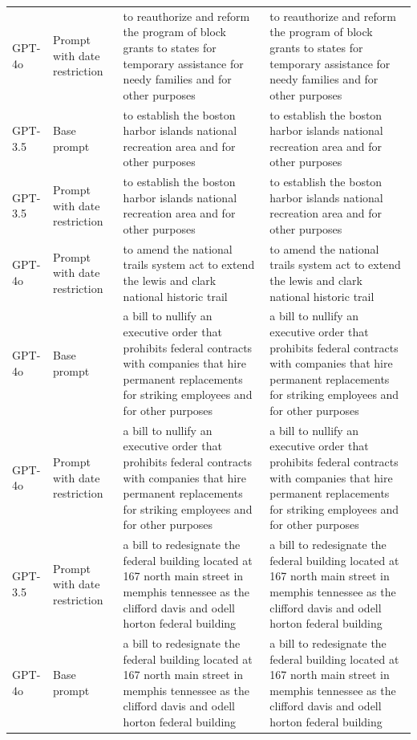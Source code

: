 \begin{longtable}{>{\raggedright\arraybackslash}p{1.4cm}>{\raggedright\arraybackslash}p{1.4cm}>{\raggedright\arraybackslash}p{5.5cm}>{\raggedright\arraybackslash}p{5.5cm}}
GPT-4o & Prompt with date restriction & to reauthorize and reform the program of block grants to states for temporary assistance for needy families and for other purposes & to reauthorize and reform the program of block grants to states for temporary assistance for needy families and for other purposes\\
GPT-3.5 & Base prompt & to establish the boston harbor islands national recreation area and for other purposes & to establish the boston harbor islands national recreation area and for other purposes\\
GPT-3.5 & Prompt with date restriction & to establish the boston harbor islands national recreation area and for other purposes & to establish the boston harbor islands national recreation area and for other purposes\\
GPT-4o & Prompt with date restriction & to amend the national trails system act to extend the lewis and clark national historic trail & to amend the national trails system act to extend the lewis and clark national historic trail\\
GPT-4o & Base prompt & a bill to nullify an executive order that prohibits federal contracts with companies that hire permanent replacements for striking employees and for other purposes & a bill to nullify an executive order that prohibits federal contracts with companies that hire permanent replacements for striking employees and for other purposes\\
GPT-4o & Prompt with date restriction & a bill to nullify an executive order that prohibits federal contracts with companies that hire permanent replacements for striking employees and for other purposes & a bill to nullify an executive order that prohibits federal contracts with companies that hire permanent replacements for striking employees and for other purposes\\
GPT-3.5 & Prompt with date restriction & a bill to redesignate the federal building located at 167 north main street in memphis tennessee as the clifford davis and odell horton federal building & a bill to redesignate the federal building located at 167 north main street in memphis tennessee as the clifford davis and odell horton federal building\\
GPT-4o & Base prompt & a bill to redesignate the federal building located at 167 north main street in memphis tennessee as the clifford davis and odell horton federal building & a bill to redesignate the federal building located at 167 north main street in memphis tennessee as the clifford davis and odell horton federal building\\

\end{longtable}
